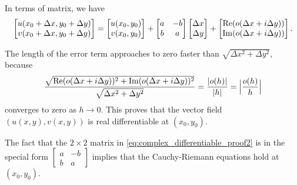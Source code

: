 In terms of matrix, we have
\begin{equation}
\begin{bmatrix}
	u(x_0+\Delta x, y_0 + \Delta y) \\ v(x_0+\Delta x, y_0 + \Delta y)
\end{bmatrix} =
\begin{bmatrix}
	u(x_0,y_0) \\ v(x_0,y_0) 
\end{bmatrix}
+\begin{bmatrix}
	a & -b \\ b & a
\end{bmatrix}
\begin{bmatrix}
	\Delta x \\ \Delta y
\end{bmatrix}
+ \begin{bmatrix}
\operatorname{\mathrm{Re}}(o(\Delta x + i \Delta y))\\
\operatorname{\mathrm{Im}}(o(\Delta x + i \Delta y))	
\end{bmatrix}.
\label{eq:complex_differentiable_proof2}
\end{equation}

The length of the error term approaches to zero faster than $\sqrt{\Delta x^2 + \Delta y ^2}$, because
$$
\frac{\sqrt{\operatorname{\mathrm{Re}}(o(\Delta x + i \Delta y))^2 + \operatorname{\mathrm{Im}}(o(\Delta x + i \Delta y))^2}}{\sqrt{\Delta x^2 + \Delta y^2}} =
\frac{|o(h)|}{|h|} = \Big| \frac{o(h)}{h }\Big| 
$$
converges to zero as $h\rightarrow 0$. This proves that the vector field $(u(x,y), v(x,y))$ is real differentiable at $(x_0,y_0)$.

The fact that the $2\times 2$ matrix in \eqref{eq:complex_differentiable_proof2} is in the special form $\begin{bmatrix}a & -b \\ b & a \end{bmatrix}$ implies that the Cauchy-Riemann equations hold at $(x_0,y_0)$.

